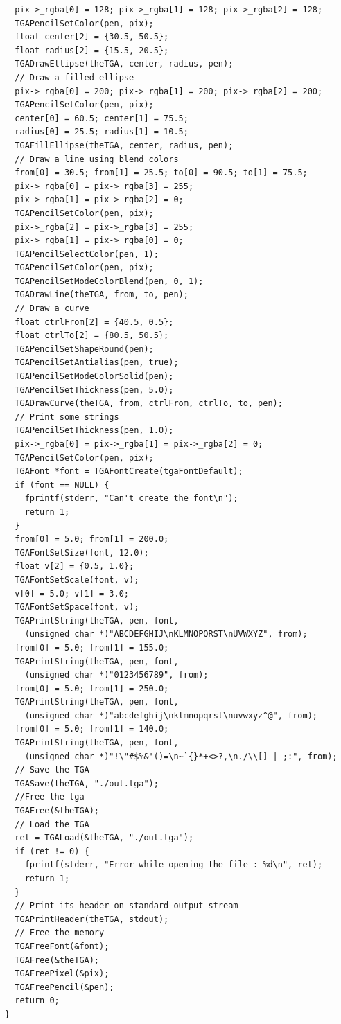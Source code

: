 \documentclass[12pt, a4paper]{article}
\begin{document}
\begin{scriptsize}
\begin{ttfamily}
\begin{lstlisting}
  pix->_rgba[0] = 128; pix->_rgba[1] = 128; pix->_rgba[2] = 128;
  TGAPencilSetColor(pen, pix);
  float center[2] = {30.5, 50.5};
  float radius[2] = {15.5, 20.5};
  TGADrawEllipse(theTGA, center, radius, pen);
  // Draw a filled ellipse
  pix->_rgba[0] = 200; pix->_rgba[1] = 200; pix->_rgba[2] = 200;
  TGAPencilSetColor(pen, pix);
  center[0] = 60.5; center[1] = 75.5;
  radius[0] = 25.5; radius[1] = 10.5;
  TGAFillEllipse(theTGA, center, radius, pen);
  // Draw a line using blend colors
  from[0] = 30.5; from[1] = 25.5; to[0] = 90.5; to[1] = 75.5;
  pix->_rgba[0] = pix->_rgba[3] = 255;
  pix->_rgba[1] = pix->_rgba[2] = 0;
  TGAPencilSetColor(pen, pix);
  pix->_rgba[2] = pix->_rgba[3] = 255;
  pix->_rgba[1] = pix->_rgba[0] = 0;
  TGAPencilSelectColor(pen, 1);
  TGAPencilSetColor(pen, pix);
  TGAPencilSetModeColorBlend(pen, 0, 1);
  TGADrawLine(theTGA, from, to, pen);
  // Draw a curve
  float ctrlFrom[2] = {40.5, 0.5};
  float ctrlTo[2] = {80.5, 50.5};
  TGAPencilSetShapeRound(pen);
  TGAPencilSetAntialias(pen, true);
  TGAPencilSetModeColorSolid(pen);
  TGAPencilSetThickness(pen, 5.0);
  TGADrawCurve(theTGA, from, ctrlFrom, ctrlTo, to, pen);
  // Print some strings
  TGAPencilSetThickness(pen, 1.0);
  pix->_rgba[0] = pix->_rgba[1] = pix->_rgba[2] = 0;
  TGAPencilSetColor(pen, pix);
  TGAFont *font = TGAFontCreate(tgaFontDefault);
  if (font == NULL) {
    fprintf(stderr, "Can't create the font\n");
    return 1;
  }
  from[0] = 5.0; from[1] = 200.0;
  TGAFontSetSize(font, 12.0);
  float v[2] = {0.5, 1.0};
  TGAFontSetScale(font, v);
  v[0] = 5.0; v[1] = 3.0;
  TGAFontSetSpace(font, v);
  TGAPrintString(theTGA, pen, font, 
    (unsigned char *)"ABCDEFGHIJ\nKLMNOPQRST\nUVWXYZ", from);
  from[0] = 5.0; from[1] = 155.0;
  TGAPrintString(theTGA, pen, font, 
    (unsigned char *)"0123456789", from);
  from[0] = 5.0; from[1] = 250.0;
  TGAPrintString(theTGA, pen, font, 
    (unsigned char *)"abcdefghij\nklmnopqrst\nuvwxyz^@", from);
  from[0] = 5.0; from[1] = 140.0;
  TGAPrintString(theTGA, pen, font, 
    (unsigned char *)"!\"#$%&'()=\n~`{}*+<>?,\n./\\[]-|_;:", from);
  // Save the TGA
  TGASave(theTGA, "./out.tga");
  //Free the tga
  TGAFree(&theTGA);
  // Load the TGA 
  ret = TGALoad(&theTGA, "./out.tga");
  if (ret != 0) {
    fprintf(stderr, "Error while opening the file : %d\n", ret);
    return 1;
  }
  // Print its header on standard output stream
  TGAPrintHeader(theTGA, stdout);
  // Free the memory
  TGAFreeFont(&font);
  TGAFree(&theTGA);
  TGAFreePixel(&pix);
  TGAFreePencil(&pen);
  return 0;
}
\end{lstlisting}
\end{ttfamily}
\end{scriptsize}
\end{document}
